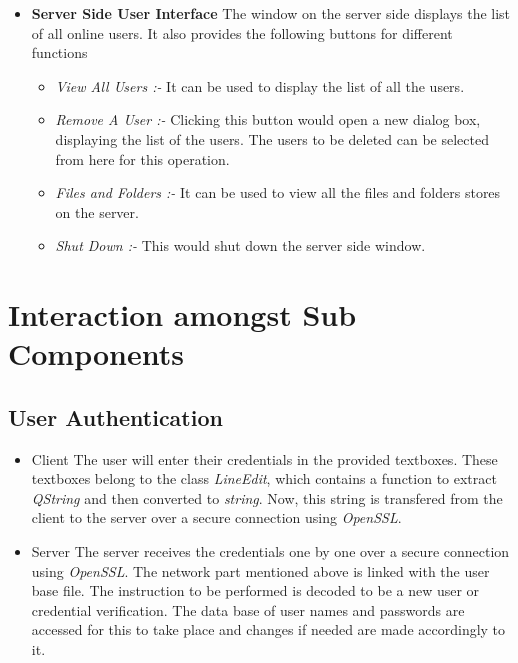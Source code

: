\documentclass{article}
\begin{document}
\begin{itemize}
					\item \textbf{Server Side User Interface}
					\newline
					The window on the server side displays the list of all online users. It also provides the following buttons for different functions
					\begin{itemize}
						\item \textit{View All Users :-} It can be used to display the list of all the users.
						\item \textit{Remove A User :-} Clicking this button would open a new dialog box, displaying the list of the users. The users to be deleted can be selected from here for this operation.
						\item \textit{Files and Folders :-} It can be used to view all the files and folders stores on the server.
						\item \textit{Shut Down :-} This would shut down the server side window.
					\end{itemize}
				\end{itemize}

	\section{Interaction amongst Sub Components}
			\subsection{User Authentication}
				\begin{itemize}
					\item Client
						\newline
						The user will enter their credentials in the provided textboxes. These textboxes belong to the class \textit{LineEdit}, which contains a function to extract \textit{QString} and then converted to \textit{string}. Now, this string is transfered from the client to the server over a secure connection using \textit{OpenSSL}.  
					\item Server
						\newline
						The server receives the credentials one by one over a secure connection using \textit{OpenSSL}. The network part mentioned above is linked with the user base file. The instruction to be performed is decoded to be a new user or credential verification. The data base of user names and passwords are accessed for this to take place and changes if needed are made accordingly to it.
				\end{itemize}
\end{document}
